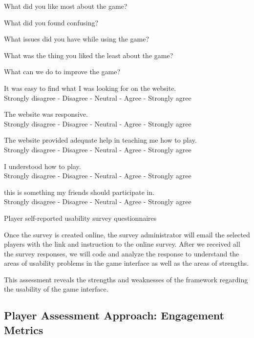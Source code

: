 \documentclass[11pt,oneside]{book}
\begin{document}
\begin{table}[ht!]
\begin{mybox}
\begin{compactenum}
\item What did you like most about the game?
\item What did you found confusing?
\item What issues did you have while using the game?
\item What was the thing you liked the least about the game?
\item What can we do to improve the game?
\item It was easy to find what I was looking for on the website.  \\
	Strongly disagree  -  Disagree  -  Neutral  -  Agree  -  Strongly agree
\item The website was responsive. \\
	Strongly disagree  -  Disagree  -  Neutral  -  Agree  -  Strongly agree
\item The website provided adequate help in teaching me how to play. \\
	Strongly disagree  -  Disagree  -  Neutral  -  Agree  -  Strongly agree
\item I understood how to play. \\
	Strongly disagree  -  Disagree  -  Neutral  -  Agree  -  Strongly agree
\item this is something my friends should participate in. \\
	Strongly disagree  -  Disagree  -  Neutral  -  Agree  -  Strongly agree
\end{compactenum}
\end{mybox}
\caption{Player self-reported usability survey questionnaires}
\label{fig:usability-metrics}  
\end{table}

Once the survey is created online, the survey administrator will email the selected players with the link and instruction to the online survey. 
After we received all the survey responses, we will code and analyze the response to understand the areas of usability problems in the game interface as well as the areas of strengths.

This assessment reveals the strengths and weaknesses of the framework regarding the usability of the game interface.
 
\subsection{Player Assessment Approach: Engagement Metrics}
\label{Engagement metrics}
\end{document}

